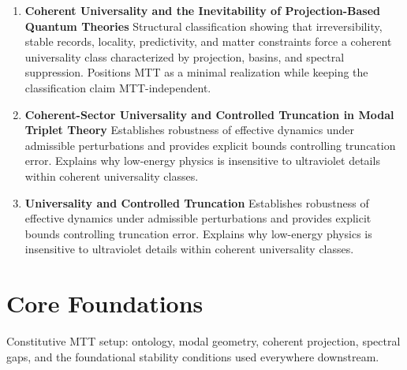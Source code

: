 \documentclass[11pt]{article}
\begin{document}
\begin{enumerate}[leftmargin=*]
\item \textbf{Coherent Universality and the Inevitability of Projection-Based Quantum Theories} Structural classification showing that irreversibility, stable records, locality, predictivity, and matter constraints force a coherent universality class characterized by projection, basins, and spectral suppression. Positions MTT as a minimal realization while keeping the classification claim MTT-independent.
\item \textbf{Coherent-Sector Universality and Controlled Truncation in Modal Triplet Theory} Establishes robustness of effective dynamics under admissible perturbations and provides explicit bounds controlling truncation error. Explains why low-energy physics is insensitive to ultraviolet details within coherent universality classes.
\item \textbf{Universality and Controlled Truncation} Establishes robustness of effective dynamics under admissible perturbations and provides explicit bounds controlling truncation error. Explains why low-energy physics is insensitive to ultraviolet details within coherent universality classes.
\end{enumerate}

\section{Core Foundations}
Constitutive MTT setup: ontology, modal geometry, coherent projection, spectral gaps, and the foundational stability conditions used everywhere downstream.
\end{document}
